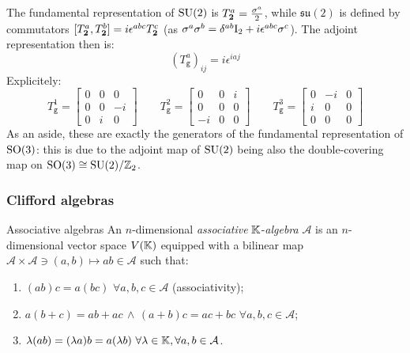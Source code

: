 The fundamental representation of $ \mathrm{SU}(2) $ is $ T^a_{\mathbf{2}} = \frac{\sigma^a}{2} $, while $ \mathfrak{su}(2) $ is defined by commutators $ [T^a_{\mathbf{2}},T^b_{\mathbf{2}}] = i \epsilon^{abc} T^c_{\mathbf{2}} $ (as $ \sigma^a \sigma^b = \delta^{ab} \mathrm{I}_2 + i \epsilon^{abc} \sigma^c $). The adjoint representation then is:
\begin{equation}
  (T^a_\mathtt{g})_{ij} = i \epsilon^{iaj}
\end{equation}
Explicitely:
\begin{equation*}
  T^1_\mathtt{g} =
  \begin{bmatrix}
    0 & 0 & 0 \\
    0 & 0 & -i \\
    0 & i & 0
  \end{bmatrix}
  \qquad
  T^2_\mathtt{g} =
  \begin{bmatrix}
    0 & 0 & i \\
    0 & 0 & 0 \\
    -i & 0 & 0
  \end{bmatrix}
  \qquad
  T^3_\mathtt{g} =
  \begin{bmatrix}
    0 & -i & 0 \\
    i & 0 & 0 \\
    0 & 0 & 0
  \end{bmatrix}
\end{equation*}
As an aside, these are exactly the generators of the fundamental representation of $ \mathrm{SO}(3) $: this is due to the adjoint map of $ \mathrm{SU}(2) $ being also the double-covering map on $ \mathrm{SO}(3) \cong \mathrm{SU}(2) / \mathbb{Z}_2 $.

\subsubsection{Clifford algebras}

\begin{definition}{Associative algebras}{}
  An $ n $-dimensional \textit{associative} $ \mathbb{K} $-\textit{algebra} $ \mathcal{A} $ is an $ n $-dimensional vector space $ V(\mathbb{K}) $ equipped with a bilinear map $ \mathcal{A} \times \mathcal{A} \ni (a,b) \mapsto ab \in \mathcal{A} $ such that:
  \begin{enumerate}
    \item $ (ab)c = a(bc) \,\,\forall a,b,c \in \mathcal{A} $ (associativity);
    \item $ a(b + c) = ab + ac \,\land\, (a + b)c = ac + bc \,\,\forall a,b,c \in \mathcal{A} $;
    \item $ \lambda (ab) = (\lambda a)b = a(\lambda b) \,\,\forall \lambda \in \mathbb{K}, \forall a,b \in \mathcal{A} $.
  \end{enumerate}
\end{definition}

